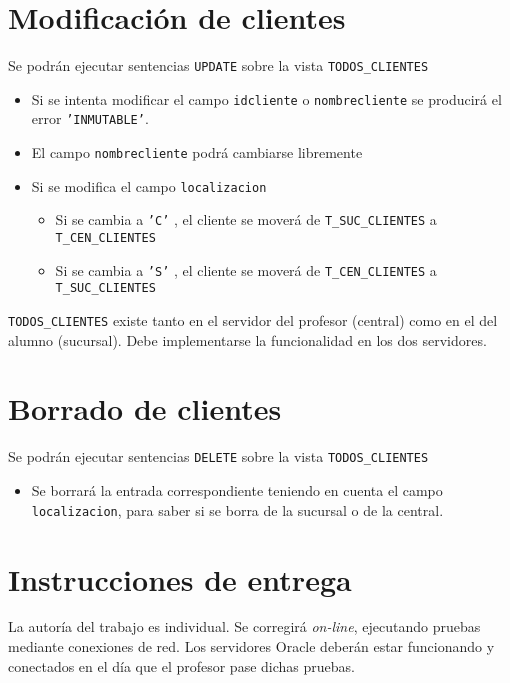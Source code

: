 \documentclass[a4paper]{article}
\begin{document}
\section{Modificación de clientes}
\label{sec:org0000015}
Se podrán ejecutar sentencias \texttt{UPDATE} sobre la vista \texttt{TODOS\_CLIENTES}
\begin{itemize}
\item Si se intenta modificar el campo \texttt{idcliente} o \texttt{nombrecliente} se producirá el error \texttt{'INMUTABLE'}.
\item El campo \texttt{nombrecliente} podrá cambiarse libremente
\item Si se modifica el campo \texttt{localizacion}
\begin{itemize}
\item Si se cambia a \texttt{'C'} , el cliente se moverá de \texttt{T\_SUC\_CLIENTES} a \texttt{T\_CEN\_CLIENTES}
\item Si se cambia a \texttt{'S'} , el cliente se moverá de \texttt{T\_CEN\_CLIENTES} a \texttt{T\_SUC\_CLIENTES}
\end{itemize}
\end{itemize}

\begin{Aviso}
\texttt{TODOS\_CLIENTES} existe tanto en el servidor del profesor (central)  como en el del alumno (sucursal). Debe implementarse la funcionalidad en los dos servidores.
\end{Aviso}

\section{Borrado de clientes}
\label{sec:org0000018}
Se podrán ejecutar sentencias \texttt{DELETE} sobre la vista \texttt{TODOS\_CLIENTES}
\begin{itemize}
\item Se borrará la entrada correspondiente teniendo en cuenta el campo \texttt{localizacion}, para saber si se borra de la sucursal o de la central.
\end{itemize}

\section{Instrucciones de entrega}
\label{sec:org000001b}
La autoría del trabajo es individual. Se corregirá \emph{on-line}, ejecutando pruebas mediante conexiones de red. Los servidores Oracle deberán estar funcionando y conectados en el día que el profesor pase dichas pruebas.
\end{document}
